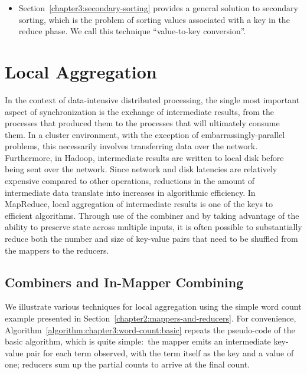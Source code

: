 \begin{itemize}
\item Section~\ref{chapter3:secondary-sorting} provides a general
  solution to secondary sorting, which is the problem of sorting
  values associated with a key in the reduce phase.  We call this
  technique ``value-to-key conversion''.


\end{itemize}

\section{Local Aggregation}
\label{chapter3:local-aggregation}

In the context of data-intensive distributed processing, the single
most important aspect of synchronization is the exchange of
intermediate results, from the processes that produced them to the
processes that will ultimately consume them.  In a cluster
environment, with the exception of embarrassingly-parallel problems,
this necessarily involves transferring data over the network.
Furthermore, in Hadoop, intermediate results are written to local disk
before being sent over the network.  Since network and disk latencies
are relatively expensive compared to other operations, reductions in
the amount of intermediate data translate into increases in
algorithmic efficiency.  In MapReduce, local aggregation of
intermediate results is one of the keys to efficient algorithms.
Through use of the combiner and by taking advantage of the ability to
preserve state across multiple inputs, it is often possible to
substantially reduce both the number and size of key-value pairs that
need to be shuffled from the mappers to the reducers.

\subsection{Combiners and In-Mapper Combining}
\label{chapter3:local-aggregation:combiners}

We illustrate various techniques for local aggregation using the
simple word count example presented in
Section~\ref{chapter2:mappers-and-reducers}.  For convenience,
Algorithm~\ref{algorithm:chapter3:word-count:basic} repeats the pseudo-code
of the basic algorithm, which is quite simple:\ the mapper emits an
intermediate key-value pair for each term observed, with the term
itself as the key and a value of one; reducers sum up the partial
counts to arrive at the final count.


